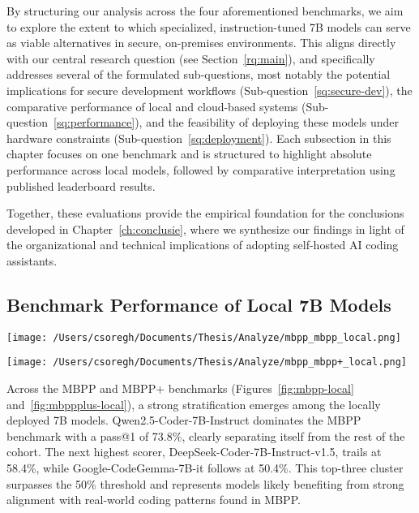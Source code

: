 By structuring our analysis across the four aforementioned benchmarks, we aim to explore the extent to which specialized, instruction-tuned 7B models can serve as viable alternatives in secure, on-premises environments. This aligns directly with our central research question (see Section~\ref{rq:main}), and specifically addresses several of the formulated sub-questions, most notably the potential implications for secure development workflows (Sub-question~\ref{sq:secure-dev}), the comparative performance of local and cloud-based systems (Sub-question~\ref{sq:performance}), and the feasibility of deploying these models under hardware constraints (Sub-question~\ref{sq:deployment}). Each subsection in this chapter focuses on one benchmark and is structured to highlight absolute performance across local models, followed by comparative interpretation using published leaderboard results.

Together, these evaluations provide the empirical foundation for the conclusions developed in Chapter~\ref{ch:conclusie}, where we synthesize our findings in light of the organizational and technical implications of adopting self-hosted \gls{AI} coding assistants.

\subsection{Benchmark Performance of Local 7B Models}


\begin{center}
	\texttt{[image: /Users/csoregh/Documents/Thesis/Analyze/mbpp\_mbpp\_local.png]}
	\label{fig:mbpp-local}
\end{center}

\begin{center}
	\texttt{[image: /Users/csoregh/Documents/Thesis/Analyze/mbpp\_mbpp+\_local.png]}
	\label{fig:mbppplus-local}
\end{center}

Across the \gls{MBPP} and \gls{MBPP}+ benchmarks (Figures~\ref{fig:mbpp-local} and~\ref{fig:mbppplus-local}), a strong stratification emerges among the locally deployed 7B models. Qwen2.5-Coder-7B-Instruct dominates the \gls{MBPP} benchmark with a pass@1 of 73.8\%, clearly separating itself from the rest of the cohort. The next highest scorer, DeepSeek-Coder-7B-Instruct-v1.5, trails at 58.4\%, while Google-CodeGemma-7B-it follows at 50.4\%. This top-three cluster surpasses the 50\% threshold and represents models likely benefiting from strong alignment with real-world coding patterns found in MBPP.

